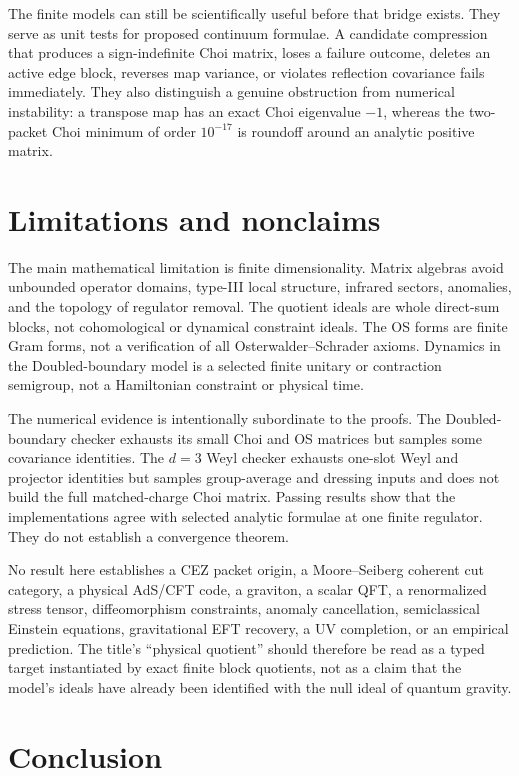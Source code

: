 \documentclass[11pt,a4paper]{article}
\theoremstyle{definition}
\theoremstyle{remark}
\begin{document}
The finite models can still be scientifically useful before that bridge exists.  They
serve as unit tests for proposed continuum formulae.  A candidate compression that
produces a sign-indefinite Choi matrix, loses a failure outcome, deletes an active edge
block, reverses map variance, or violates reflection covariance fails immediately.
They also distinguish a genuine obstruction from numerical instability: a transpose
map has an exact Choi eigenvalue $-1$, whereas the two-packet Choi minimum of order
$10^{-17}$ is roundoff around an analytic positive matrix.

\section{Limitations and nonclaims}

The main mathematical limitation is finite dimensionality.  Matrix algebras avoid
unbounded operator domains, type-III local structure, infrared sectors, anomalies, and
the topology of regulator removal.  The quotient ideals are whole direct-sum blocks,
not cohomological or dynamical constraint ideals.  The OS forms are finite Gram forms,
not a verification of all Osterwalder--Schrader axioms.  Dynamics in the Doubled-boundary model
is a selected finite unitary or contraction semigroup, not a Hamiltonian constraint or
physical time.

The numerical evidence is intentionally subordinate to the proofs.  The Doubled-boundary
checker exhausts its small Choi and OS matrices but samples some covariance identities.
The $d=3$ Weyl checker exhausts one-slot Weyl and projector identities but samples
group-average and dressing inputs and does not build the full matched-charge Choi matrix.  Passing
results show that the implementations agree with selected analytic formulae at one
finite regulator.  They do not establish a convergence theorem.

No result here establishes a CEZ packet origin, a Moore--Seiberg coherent cut category,
a physical AdS/CFT code, a graviton, a scalar QFT, a renormalized stress tensor,
diffeomorphism constraints, anomaly cancellation, semiclassical Einstein equations,
gravitational EFT recovery, a UV completion, or an empirical prediction.  The title's
``physical quotient'' should therefore be read as a typed target instantiated by exact
finite block quotients, not as a claim that the model's ideals have already been
identified with the null ideal of quantum gravity.

\section{Conclusion}
\end{document}
